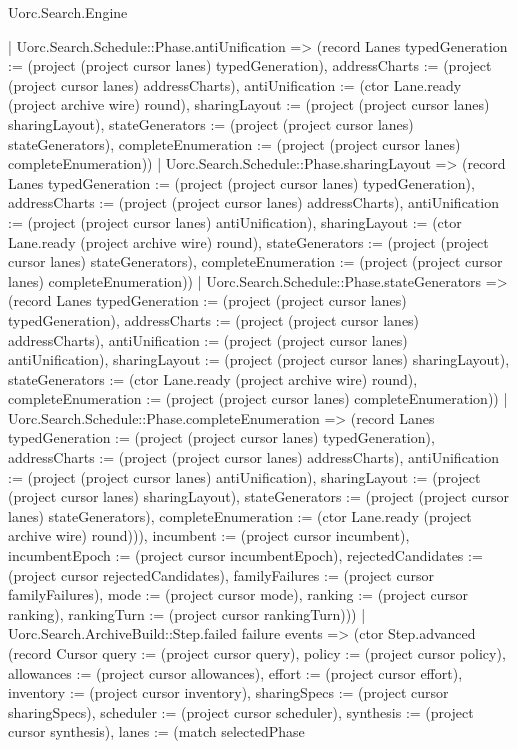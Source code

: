 \begin{lexlean}{Uorc.Search.Engine}
\begin{semanticmodule}
{{      | Uorc.Search.Schedule::Phase.antiUnification => (record Lanes {typedGeneration := (project (project cursor lanes) typedGeneration), addressCharts := (project (project cursor lanes) addressCharts), antiUnification := (ctor Lane.ready (project archive wire) round), sharingLayout := (project (project cursor lanes) sharingLayout), stateGenerators := (project (project cursor lanes) stateGenerators), completeEnumeration := (project (project cursor lanes) completeEnumeration)})
      | Uorc.Search.Schedule::Phase.sharingLayout => (record Lanes {typedGeneration := (project (project cursor lanes) typedGeneration), addressCharts := (project (project cursor lanes) addressCharts), antiUnification := (project (project cursor lanes) antiUnification), sharingLayout := (ctor Lane.ready (project archive wire) round), stateGenerators := (project (project cursor lanes) stateGenerators), completeEnumeration := (project (project cursor lanes) completeEnumeration)})
      | Uorc.Search.Schedule::Phase.stateGenerators => (record Lanes {typedGeneration := (project (project cursor lanes) typedGeneration), addressCharts := (project (project cursor lanes) addressCharts), antiUnification := (project (project cursor lanes) antiUnification), sharingLayout := (project (project cursor lanes) sharingLayout), stateGenerators := (ctor Lane.ready (project archive wire) round), completeEnumeration := (project (project cursor lanes) completeEnumeration)})
      | Uorc.Search.Schedule::Phase.completeEnumeration => (record Lanes {typedGeneration := (project (project cursor lanes) typedGeneration), addressCharts := (project (project cursor lanes) addressCharts), antiUnification := (project (project cursor lanes) antiUnification), sharingLayout := (project (project cursor lanes) sharingLayout), stateGenerators := (project (project cursor lanes) stateGenerators), completeEnumeration := (ctor Lane.ready (project archive wire) round)})), incumbent := (project cursor incumbent), incumbentEpoch := (project cursor incumbentEpoch), rejectedCandidates := (project cursor rejectedCandidates), familyFailures := (project cursor familyFailures), mode := (project cursor mode), ranking := (project cursor ranking), rankingTurn := (project cursor rankingTurn)}))
    | Uorc.Search.ArchiveBuild::Step.failed failure events => (ctor Step.advanced (record Cursor {query := (project cursor query), policy := (project cursor policy), allowances := (project cursor allowances), effort := (project cursor effort), inventory := (project cursor inventory), sharingSpecs := (project cursor sharingSpecs), scheduler := (project cursor scheduler), synthesis := (project cursor synthesis), lanes := (match selectedPhase
}}
\end{semanticmodule}
\end{lexlean}
